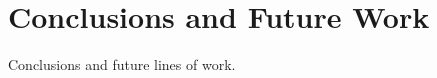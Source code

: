 
\chapter{Conclusions and Future Work}
\label{cap:conclusions}

Conclusions and future lines of work.



